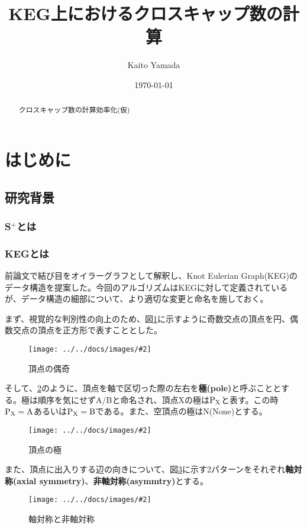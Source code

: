 \documentclass[11pt,a4j]{jarticle}
\title{KEG上におけるクロスキャップ数の計算}
\author{Kaito Yamada}
\date{\today}
\newcommand{\splus}{S${}^\text{+}$}
\newcommand{\f}[1]{$\rm{#1}$} %
\newcommand{\image}[4][height=100pt]{%
\begin{figure}[htbp]
    \centering
    \texttt{[image: ../../docs/images/\#2]}
    \caption{#3}
    \label{fig:#4}
\end{figure}%
}
\begin{document}
\maketitle
\vspace{30mm}
\begin{abstract}
    クロスキャップ数の計算効率化(仮)
\end{abstract}

\clearpage

\tableofcontents
\clearpage

\pagestyle{plain}
\lhead{\rightmark}

\section{はじめに}

\subsection{研究背景}
\subsubsection{\splus とは}
\subsubsection{KEGとは}
前論文\cite{keg}で結び目をオイラーグラフとして解釈し、Knot Eulerian Graph(KEG)のデータ構造を提案した。今回のアルゴリズムはKEGに対して定義されているが、データ構造の細部について、より適切な変更と命名を施しておく。

まず、視覚的な判別性の向上のため、図\ref{fig:parity}に示すように奇数交点の頂点を円、偶数交点の頂点を正方形で表すこととした。
\image{about_parity.jpg}{頂点の偶奇}{parity}

そして、\ref{fig:pole}のように、頂点を軸で区切った際の左右を\textbf{極(pole)}と呼ぶこととする。極は順序を気にせずA/Bと命名され、頂点Xの極は\f{P_X}と表す。この時\f{P_X=A}あるいは\f{P_X=B}である。また、空頂点の極はN(None)とする。
\image[height=200pt]{about_pole.jpg}{頂点の極}{pole}

また、頂点に出入りする辺の向きについて、図\ref{fig:axis}に示す2パターンをそれぞれ\textbf{軸対称(axial symmetry)}、\textbf{非軸対称(asymmtry)}とする。
\image{about_axis.jpg}{軸対称と非軸対称}{axis}
\end{document}
